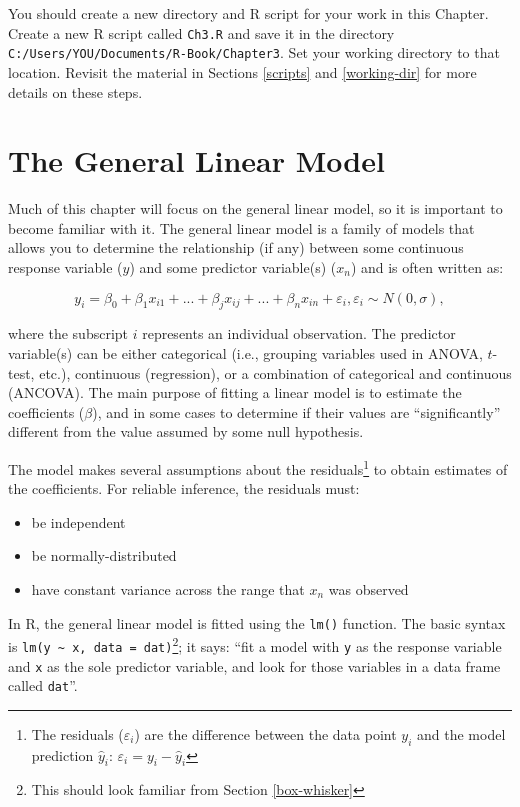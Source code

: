 \documentclass[]{book}
\providecommand{\tightlist}{%
  \setlength{\itemsep}{0pt}\setlength{\parskip}{0pt}}
\let\rmarkdownfootnote\footnote%
\def\footnote{\protect\rmarkdownfootnote}
\theoremstyle{definition}
\theoremstyle{definition}
\theoremstyle{definition}
\theoremstyle{remark}
\begin{document}
You should create a new directory and R script for your work in this
Chapter. Create a new R script called \texttt{Ch3.R} and save it in the
directory \texttt{C:/Users/YOU/Documents/R-Book/Chapter3}. Set your
working directory to that location. Revisit the material in Sections
\ref{scripts} and \ref{working-dir} for more details on these steps.

\section{The General Linear Model}\label{lm}

Much of this chapter will focus on the general linear model, so it is
important to become familiar with it. The general linear model is a
family of models that allows you to determine the relationship (if any)
between some continuous response variable (\(y\)) and some predictor
variable(s) (\(x_n\)) and is often written as:

\begin{equation}
  y_i=\beta_0 + \beta_1 x_{i1} + ... + \beta_j x_{ij}+ ... + \beta_n x_{in} + \varepsilon_i, \varepsilon_i \sim N(0,\sigma),
\label{eq:lin-mod}
\end{equation}

where the subscript \(i\) represents an individual observation. The
predictor variable(s) can be either categorical (i.e., grouping
variables used in ANOVA, \(t\)-test, etc.), continuous (regression), or
a combination of categorical and continuous (ANCOVA). The main purpose
of fitting a linear model is to estimate the coefficients (\(\beta\)),
and in some cases to determine if their values are ``significantly''
different from the value assumed by some null hypothesis.

The model makes several assumptions about the residuals\footnote{The
  residuals (\(\varepsilon_i\)) are the difference between the data
  point \(y_i\) and the model prediction \(\hat{y}_i\):
  \(\varepsilon_i=y_i-\hat{y}_i\)} to obtain estimates of the
coefficients. For reliable inference, the residuals must:

\begin{itemize}
\tightlist
\item
  be independent
\item
  be normally-distributed
\item
  have constant variance across the range that \(x_n\) was observed
\end{itemize}

In R, the general linear model is fitted using the \texttt{lm()}
function. The basic syntax is
\texttt{lm(y\ \textasciitilde{}\ x,\ data\ =\ dat)}\footnote{This should
  look familiar from Section \ref{box-whisker}}; it says: ``fit a model
with \texttt{y} as the response variable and \texttt{x} as the sole
predictor variable, and look for those variables in a data frame called
\texttt{dat}''.
\end{document}
